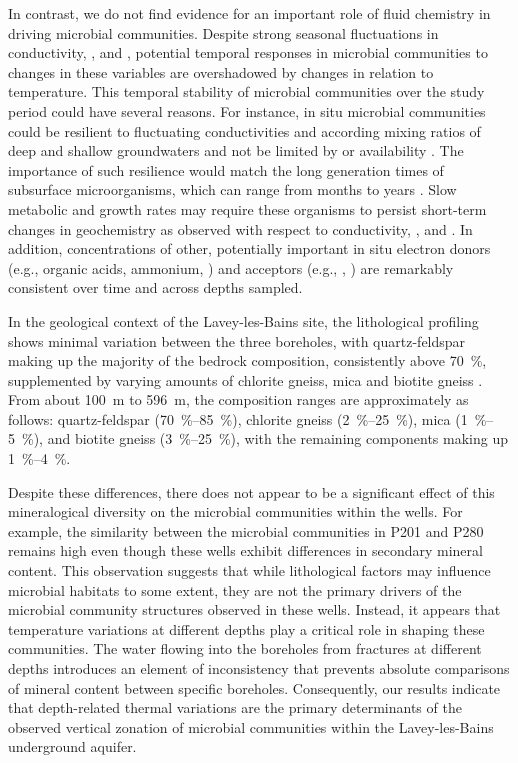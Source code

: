 In contrast, we do not find evidence for an important role of fluid chemistry in driving microbial communities.
Despite strong seasonal fluctuations in conductivity, , and , potential temporal responses in microbial communities to changes in these variables are overshadowed by changes in relation to temperature.
This temporal stability of microbial communities over the study period could have several reasons.
For instance, in situ microbial communities could be resilient to fluctuating conductivities and according mixing ratios of deep and shallow groundwaters and not be limited by  or  availability \citep{lever2015life, hoehler2013microbial}.
The importance of such resilience would match the long generation times of subsurface microorganisms, which can range from months to years \citep{joergensen2011deep}.
Slow metabolic and growth rates may require these organisms to persist short-term changes in geochemistry as observed with respect to conductivity, , and .
In addition, concentrations of other, potentially important in situ electron donors (e.g., organic acids, ammonium, ) and acceptors (e.g., , ) are remarkably consistent over time and across depths sampled.

In the geological context of the Lavey-les-Bains site, the lithological profiling shows minimal variation between the three boreholes, with quartz-feldspar making up the majority of the bedrock composition, consistently above \SI{70}{\percent}, supplemented by varying amounts of chlorite gneiss, mica and biotite gneiss \citep{swisstopo2024lavey1}.
From about \SI{100}{\meter} to \SI{596}{\meter}, the composition ranges are approximately as follows: quartz-feldspar (\SIrange{70}{85}{\percent}), chlorite gneiss (\SIrange{2}{25}{\percent}), mica (\SIrange{1}{5}{\percent}), and biotite gneiss (\SIrange{3}{25}{\percent}), with the remaining components making up \SIrange{1}{4}{\percent}.

Despite these differences, there does not appear to be a significant effect of this mineralogical diversity on the microbial communities within the wells.
For example, the similarity between the microbial communities in P201 and P280 remains high even though these wells exhibit differences in secondary mineral content.
This observation suggests that while lithological factors may influence microbial habitats to some extent, they are not the primary drivers of the microbial community structures observed in these wells.
Instead, it appears that temperature variations at different depths play a critical role in shaping these communities.
The water flowing into the boreholes from fractures at different depths introduces an element of inconsistency that prevents absolute comparisons of mineral content between specific boreholes.
Consequently, our results indicate that depth-related thermal variations are the primary determinants of the observed vertical zonation of microbial communities within the Lavey-les-Bains underground aquifer.

